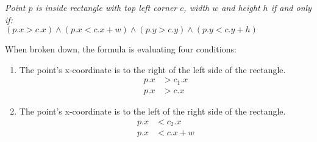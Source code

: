 \begin{center}
    \textit{Point $p$ is inside rectangle with top left corner $c$, width $w$ and height $h$ if and only if:} \\
    $(p.x > c.x) \land (p.x < c.x + w) \land (p.y > c.y) \land (p.y < c.y + h)$
\end{center}
When broken down, the formula is evaluating four conditions:
\begin{multicols}{2}
    \begin{enumerate}
        \item The point's x-coordinate is to the right of the left side of the rectangle.
              \begin{equation*}
                  \begin{aligned}
                      p.x & > c_1.x \\
                      p.x & > c.x
                  \end{aligned}
              \end{equation*}

        \item The point's x-coordinate is to the left of the right side of the rectangle.
              \begin{equation*}
                  \begin{aligned}
                      p.x & < c_2.x   \\
                      p.x & < c.x + w
                  \end{aligned}
              \end{equation*}
    \end{enumerate}
\end{multicols}


